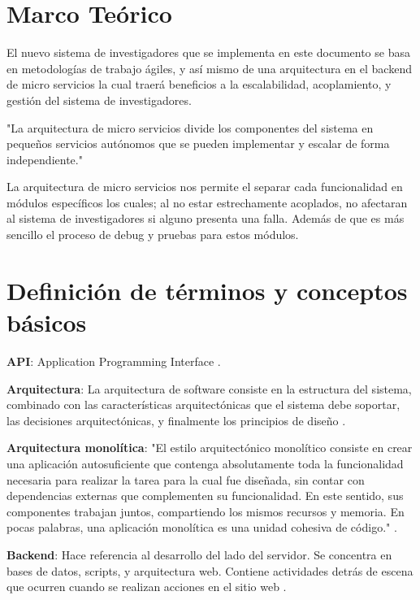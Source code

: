 \section{Marco Teórico}

    El nuevo sistema de investigadores que se implementa en este documento se basa en metodologías de trabajo ágiles, y así mismo de una arquitectura en el backend de micro servicios la cual traerá beneficios a la escalabilidad, acoplamiento, y gestión del sistema de investigadores.
    
    "La arquitectura de micro servicios divide los componentes del sistema en pequeños servicios autónomos que se pueden implementar y escalar de forma independiente."\cite{KryptonSolid}

    La arquitectura de micro servicios nos permite el separar cada funcionalidad en módulos específicos los cuales; al no estar estrechamente acoplados, no afectaran al sistema de investigadores si alguno presenta una falla. Además de que es más sencillo el proceso de debug y pruebas para estos módulos.

\section{Definición de términos y conceptos básicos}

    \textbf{API}: Application Programming Interface \cite{jacobson2012apis}.

    \textbf{Arquitectura}: La arquitectura de software consiste en la estructura del sistema, combinado con las características arquitectónicas que el sistema debe soportar, las decisiones arquitectónicas, y finalmente los principios de diseño \cite{richards2020fundamentals}.
    
    \textbf{Arquitectura monolítica}: "El estilo arquitectónico monolítico consiste en crear una aplicación autosuficiente que contenga absolutamente toda la funcionalidad necesaria para realizar la tarea para la cual fue diseñada, sin contar con dependencias externas que complementen su funcionalidad. En este sentido, sus componentes trabajan juntos, compartiendo los mismos recursos y memoria. En pocas palabras, una aplicación monolítica es una unidad cohesiva de código." \cite{monolitic}.

    \textbf{Backend}: Hace referencia al desarrollo del lado del servidor. Se concentra en bases de datos, scripts, y arquitectura web. Contiene actividades detrás de escena que ocurren cuando se realizan acciones en el sitio web \cite{Backend}.

